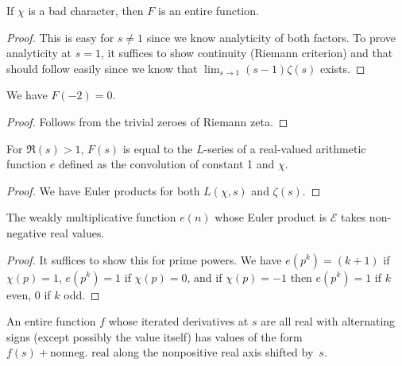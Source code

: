 \begin{lemma} \label{F_entire}
  \leanok
  If $\chi$ is a bad character, then $F$ is an entire function.
\end{lemma}

\begin{proof}
  \leanok
  This is easy for $s \ne 1$ since we know analyticity of both factors. To prove analyticity at $s = 1$, it suffices to show continuity (Riemann criterion) and that should follow easily since we know that $\lim_{s \to 1} (s - 1) \zeta(s)$ exists.
\end{proof}

\begin{lemma}
 \label{zero_of_F}
 \leanok
 We have $F(-2) = 0$.
\end{lemma}

\begin{proof}
 \leanok
 Follows from the trivial zeroes of Riemann zeta.
\end{proof}

\begin{lemma} \label{F_Euler_product}
  \leanok
  For $\Re(s) > 1$, $F(s)$ is equal to the $L$-series of a real-valued
  arithmetic function $e$ defined as the convolution of constant 1 and $\chi$.
\end{lemma}

\begin{proof}
  \leanok
  We have Euler products for both $L(\chi, s)$ and $\zeta(s)$.
\end{proof}

\begin{lemma}
  \label{nonneg_coeffs}
  \leanok
  The weakly multiplicative function $e(n)$ whose Euler product is $\mathcal{E}$ takes non-negative real values.
\end{lemma}

\begin{proof}
  \leanok
  It suffices to show this for prime powers. We have $e(p^k) = (k + 1)$ if $\chi(p) = 1$, $e(p^k) = 1$ if $\chi(p) = 0$, and if $\chi(p) = -1$ then $e(p^k) = 1$ if $k$ even, $0$ if $k$ odd.
\end{proof}

\begin{lemma} \label{positivity_from_derivs}
  \leanok
  An entire function $f$ whose iterated derivatives at $s$ are all real with alternating signs
  (except possibly the value itself) has values of the form $f(s) + \text{nonneg. real}$
  along the nonpositive real axis shifted by~$s$.
\end{lemma}

